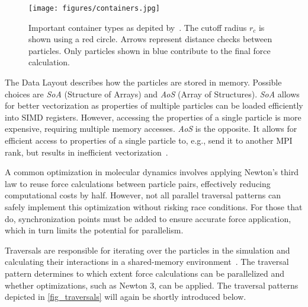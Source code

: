 \documentclass[conference]{IEEEtran}
\begin{document}
\begin{description}[style=nextline]
        \begin{figure}[h]
            \centering
            \texttt{[image: figures/containers.jpg]}
            \caption{Important container types as depited by~\cite{Gratl2022AutoPas}. The cutoff radius $r_c$ is shown using a red circle. Arrows represent distance checks between particles. Only particles shown in blue contribute to the final force calculation.}
            \label{fig_containers}
        \end{figure}

    \item[Data Layout]
        The Data Layout describes how the particles are stored in memory. Possible choices are \textit{SoA} (Structure of Arrays) and \textit{AoS} (Array of Structures). \textit{SoA} allows for better vectorization as properties of multiple particles can be loaded efficiently into SIMD registers. However, accessing the properties of a single particle is more expensive, requiring
        multiple memory accesses. \textit{AoS} is the opposite. It allows for efficient access to properties of a single particle to, e.g., send it to another MPI rank, but results in inefficient vectorization~\cite{Gratl2022AutoPas}.

    \item[Newton 3]
        A common optimization in molecular dynamics involves applying Newton's third law to reuse force calculations between particle pairs, effectively reducing computational costs by half. However, not all parallel traversal patterns can safely implement this optimization without risking race conditions. For those that do, synchronization points must be added to ensure accurate force application, which in turn limits the potential for parallelism.

    \item[Traversal]
        Traversals are responsible for iterating over the particles in the simulation and calculating their interactions in a shared-memory environment~\cite{SECKLER2021101296}. The traversal pattern determines to which extent force calculations can be parallelized and whether optimizations, such as Newton 3, can be applied. The traversal patterns depicted in \autoref{fig_traversals} will again be shortly introduced below.


\end{description}
\end{document}
